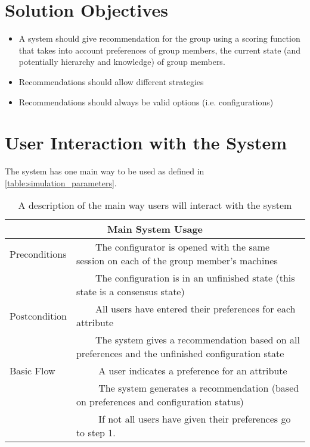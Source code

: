 \documentclass{article}
\newcommand{\tabitem}[1][\textbullet]{~~\llap{#1}~~}
\begin{document}
\section{Solution Objectives}

\begin{itemize}
    \item A system should give recommendation for the group using a scoring function that takes into account preferences of group members, the current state (and potentially hierarchy and knowledge)  of group members.
    \item Recommendations should allow different strategies
    \item Recommendations should always be valid options (i.e. configurations)
\end{itemize}

\section{User Interaction with the System}
The system has one main way to be used as defined in \autoref{table:simulation_parameters}.

\begin{table}
    \begin{center}
        \begin{tabularx}{\columnwidth}{l|X}
            \multicolumn{2}{c}{Main System Usage} \\
            \hline
            Preconditions   & \tabitem The configurator is opened with the same session on each of the group member's machines \\
                            & \tabitem The configuration is in an unfinished state (this state is a consensus state)\\
            \hline
            Postcondition   & \tabitem All users have entered their preferences for each attribute \\
                            & \tabitem The system gives a recommendation based on all preferences and the unfinished configuration state \\
            \hline
            Basic Flow      & \tabitem[1.] A user indicates a preference for an attribute \\
                            & \tabitem[2.] The system generates a recommendation (based on preferences and configuration status) \\
                            & \tabitem[3.] If not all users have given their preferences go to step 1. \\
            \hline
        \end{tabularx}
        \caption{A description of the main way users will interact with the system}
        \label{table:simulation_parameters}
    \end{center}
\end{table}
\end{document}
